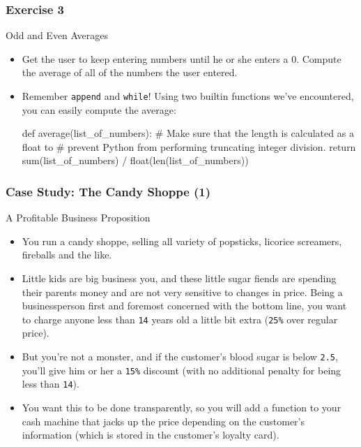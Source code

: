 \documentclass[10pt]{beamer}
\begin{document}
\begin{frame}[fragile]
  \frametitle{Exercise 3}
  \begin{block}{Odd and Even Averages}
    \begin{itemize}
      \item Get the user to keep entering numbers until he or she enters a 0.
        Compute the average of all of the numbers the user entered.
      \item Remember \texttt{append} and \texttt{while}!
        Using two builtin functions we've encountered, you can easily compute the average:
        \footnotesize
        \begin{pythoncode}
  def average(list_of_numbers):
    # Make sure that the length is calculated as a float to
    # prevent Python from performing truncating integer division.
    return sum(list_of_numbers) / float(len(list_of_numbers))
        \end{pythoncode}
    \end{itemize} 
  \end{block}
\end{frame}
    
\begin{frame}
  \frametitle{Case Study: The Candy Shoppe (1)}
  \begin{block}{A Profitable Business Proposition}
    \begin{itemize}
      \item You run a candy shoppe, selling all variety of popsticks, licorice screamers, fireballs and the like.
      \item Little kids are big business you, and these little sugar fiends are spending their parents money and are not very sensitive to changes in price.
        Being a businessperson first and foremost concerned with the bottom line, you want to charge anyone less than \texttt{14} years old a little bit extra (\texttt{25\%} over regular price).
      \item But you're not a monster, and if the customer's blood sugar is below \texttt{2.5}, you'll give him or her a \texttt{15\%} discount (with no additional penalty for being less than \texttt{14}).
      \item You want this to be done transparently, so you will add a function to your cash machine that jacks up the price depending on the customer's information (which is stored in the customer's loyalty card).
    \end{itemize}
  \end{block}
\end{frame}
\end{document}
